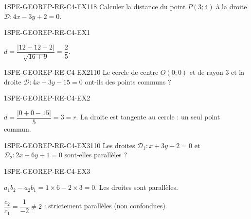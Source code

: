 

\begin{exercice}{1SPE-GEOREP-RE-C4-EX1}{1}{8}
Calculer la distance du point $P(3 ; 4)$ à la droite $\mathcal{D} : 4x - 3y + 2 = 0$.
\end{exercice}


\begin{corrige}{1SPE-GEOREP-RE-C4-EX1}

$d = \dfrac{|12 - 12 + 2|}{\sqrt{16+9}} = \dfrac{2}{5}$.

\end{corrige}

\begin{exercice}{1SPE-GEOREP-RE-C4-EX2}{1}{10}
Le cercle de centre $O(0 ; 0)$ et de rayon $3$ et la droite $\mathcal{D} : 4x + 3y - 15 = 0$ ont-ils des points communs ?
\end{exercice}



\begin{corrige}{1SPE-GEOREP-RE-C4-EX2}

$d = \dfrac{|0 + 0 - 15|}{5} = 3 = r$. La droite est tangente au cercle : un seul point commun.

\end{corrige}

\begin{exercice}{1SPE-GEOREP-RE-C4-EX3}{1}{10}
Les droites $\mathcal{D}_1 : x + 3y - 2 = 0$ et $\mathcal{D}_2 : 2x + 6y + 1 = 0$ sont-elles parallèles ?
\end{exercice}


\begin{corrige}{1SPE-GEOREP-RE-C4-EX3}

$a_1 b_2 - a_2 b_1 = 1 \times 6 - 2 \times 3 = 0$. Les droites sont parallèles.

$\dfrac{c_2}{c_1} = \dfrac{1}{-2}
\neq 2$ : strictement parallèles (non confondues).

\end{corrige}
